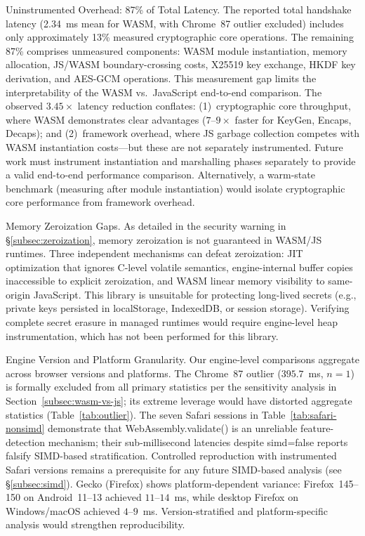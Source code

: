 \documentclass[11pt,a4paper]{article}
\def\textbf#1{#1}%
\def\texttt#1{#1}%
\def\emph#1{#1}%
\begin{document}
\textbf{Uninstrumented Overhead: 87\% of Total Latency.} The reported total handshake latency (2.34~ms mean for WASM, with Chrome~87 outlier excluded) includes only approximately 13\% measured cryptographic core operations. The remaining 87\% comprises unmeasured components: WASM module instantiation, memory allocation, JS/WASM boundary-crossing costs, X25519 key exchange, HKDF key derivation, and AES-GCM operations. This measurement gap limits the interpretability of the WASM vs.\ JavaScript end-to-end comparison. The observed $3.45\times$ latency reduction conflates: (1)~cryptographic core throughput, where WASM demonstrates clear advantages ($7$--$9\times$ faster for KeyGen, Encaps, Decaps); and (2)~framework overhead, where JS garbage collection competes with WASM instantiation costs---but these are \emph{not separately instrumented}. Future work must instrument instantiation and marshalling phases separately to provide a valid end-to-end performance comparison. Alternatively, a warm-state benchmark (measuring after module instantiation) would isolate cryptographic core performance from framework overhead.

\textbf{Memory Zeroization Gaps.} As detailed in the security warning in \S\ref{subsec:zeroization}, memory zeroization is \textbf{not guaranteed} in WASM/JS runtimes. Three independent mechanisms can defeat zeroization: JIT optimization that ignores C-level \texttt{volatile} semantics, engine-internal buffer copies inaccessible to explicit zeroization, and WASM linear memory visibility to same-origin JavaScript. \textbf{This library is unsuitable for protecting long-lived secrets} (e.g., private keys persisted in \texttt{localStorage}, \texttt{IndexedDB}, or session storage). Verifying complete secret erasure in managed runtimes would require engine-level heap instrumentation, which has not been performed for this library.

\textbf{Engine Version and Platform Granularity.} Our engine-level comparisons aggregate across browser versions and platforms. The Chrome~87 outlier ($395.7$~ms, $n=1$) is formally excluded from all primary statistics per the sensitivity analysis in Section~\ref{subsec:wasm-vs-js}; its extreme leverage would have distorted aggregate statistics (Table~\ref{tab:outlier}). The seven Safari sessions in Table~\ref{tab:safari-nonsimd} demonstrate that \texttt{WebAssembly.validate()} is an unreliable feature-detection mechanism; their sub-millisecond latencies despite \texttt{simd=false} reports falsify SIMD-based stratification. Controlled reproduction with instrumented Safari versions remains a prerequisite for any future SIMD-based analysis (see \S\ref{subsec:simd}). Gecko (Firefox) shows platform-dependent variance: Firefox~145--150 on Android~11--13 achieved $11$--$14$~ms, while desktop Firefox on Windows/macOS achieved $4$--$9$~ms. Version-stratified and platform-specific analysis would strengthen reproducibility.
\end{document}
